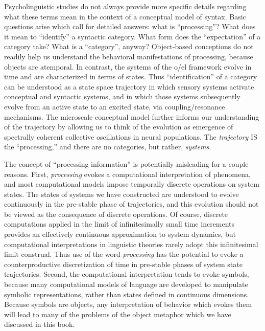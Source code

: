 Psycholinguistic studies do not always provide more specific details regarding what these terms mean in the context of a conceptual model of syntax. Basic questions arise which call for detailed answers: what is “processing”? What does it mean to “identify” a syntactic category. What form does the “expectation” of a category take? What is a “category”, anyway? Object-based conceptions do not readily help us understand the behavioral manifestations of processing, because objects are atemporal. In contrast, the systems of the o/el framework evolve in time and are characterized in terms of states. Thus “identification” of a category can be understood as a state space trajectory in which sensory systems activate conceptual and syntactic systems, and in which those systems subsequently evolve from an active state to an excited state, via coupling/resonance mechanisms. The microscale conceptual model further informs our understanding of the trajectory by allowing us to think of the evolution as emergence of spectrally coherent collective oscillations in neural populations. The \textit{trajectory} IS the “processing,” and there are no categories, but rather, \textit{systems}.

The concept of “processing information” is potentially misleading for a couple reasons. First, \textit{processing} evokes a computational interpretation of phenomena, and most computational models impose temporally discrete operations on system states. The states of systems we have constructed are understood to evolve continuously in the pre-stable phase of trajectories, and this evolution should not be viewed as the consequence of discrete operations. Of course, discrete computations applied in the limit of infinitesimally small time increments provides an effectively continuous approximation to system dynamics, but computational interpretations in linguistic theories rarely adopt this infinitesimal limit construal. Thus use of the word \textit{processing} has the potential to evoke a counterproductive discretization of time in pre-stable phases of system state trajectories. Second, the computational interpretation tends to evoke symbols, because many computational models of language are developed to manipulate symbolic representations, rather than states defined in continuous dimensions. Because symbols are objects, any interpretation of behavior which evokes them will lead to many of the problems of the object metaphor which we have discussed in this book. 

